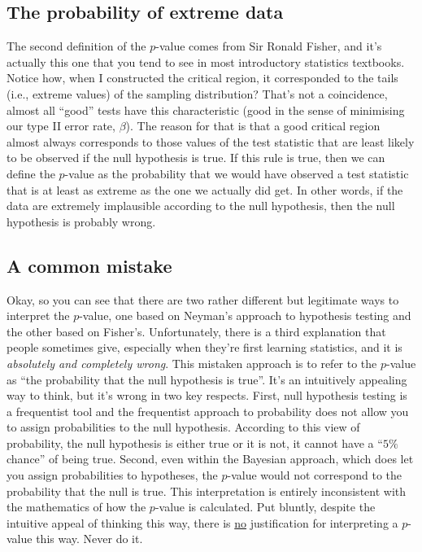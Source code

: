 \documentclass[
  a4paper,
]{book}
\begin{document}
\subsection{The probability of extreme
data}\label{the-probability-of-extreme-data}

The second definition of the \(p\)-value comes from Sir Ronald Fisher,
and it's actually this one that you tend to see in most introductory
statistics textbooks. Notice how, when I constructed the critical
region, it corresponded to the tails (i.e., extreme values) of the
sampling distribution? That's not a coincidence, almost all ``good''
tests have this characteristic (good in the sense of minimising our type
II error rate, \(\beta\)). The reason for that is that a good critical
region almost always corresponds to those values of the test statistic
that are least likely to be observed if the null hypothesis is true. If
this rule is true, then we can define the \(p\)-value as the probability
that we would have observed a test statistic that is at least as extreme
as the one we actually did get. In other words, if the data are
extremely implausible according to the null hypothesis, then the null
hypothesis is probably wrong.

\subsection{A common mistake}\label{a-common-mistake}

Okay, so you can see that there are two rather different but legitimate
ways to interpret the \(p\)-value, one based on Neyman's approach to
hypothesis testing and the other based on Fisher's. Unfortunately, there
is a third explanation that people sometimes give, especially when
they're first learning statistics, and it is \emph{absolutely and
completely wrong}. This mistaken approach is to refer to the \(p\)-value
as ``the probability that the null hypothesis is true''. It's an
intuitively appealing way to think, but it's wrong in two key respects.
First, null hypothesis testing is a frequentist tool and the frequentist
approach to probability does not allow you to assign probabilities to
the null hypothesis. According to this view of probability, the null
hypothesis is either true or it is not, it cannot have a ``\(5\%\)
chance'' of being true. Second, even within the Bayesian approach, which
does let you assign probabilities to hypotheses, the \(p\)-value would
not correspond to the probability that the null is true. This
interpretation is entirely inconsistent with the mathematics of how the
\(p\)-value is calculated. Put bluntly, despite the intuitive appeal of
thinking this way, there is \ul{no} justification for interpreting a
\(p\)-value this way. Never do it.
\end{document}
